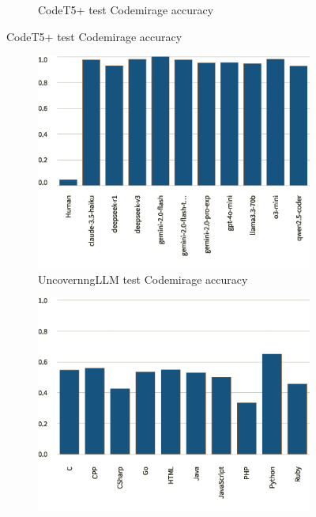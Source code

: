 \begin{figure}[H]
\begin{subfigure}[t]{0.5\textwidth}
        \caption{CodeT5+ test Codemirage accuracy}
        \label{fig:b2}
    \end{subfigure}
\end{figure}





\begin{figure}[H]
    \centering
    \begin{subfigure}[t]{0.35\textwidth}
        \centering
        \includegraphics[width=\linewidth]{img/TEST/UncovernngLLM/visualization(57).png}
        \caption{UncovernngLLM test Codemirage accuracy}
        \label{fig:esfes2}
    \end{subfigure}
    \hfill
    \begin{subfigure}[t]{0.35\textwidth}
        \centering
        \includegraphics[width=\linewidth]{img/TEST/UncovernngLLM/visualization(58).png}

\end{subfigure}
\end{figure}

